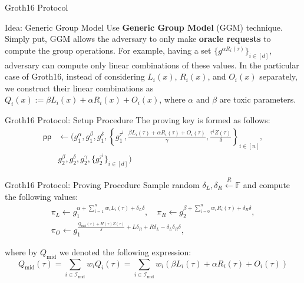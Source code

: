 \documentclass{zkdl-presentation-template}
\begin{document}
    \begin{frame}{Groth16 Protocol}
        \begin{block}{Idea: Generic Group Model}
            Use \textbf{Generic Group Model} (GGM) technique. Simply put, GGM allows the adversary to only make \textbf{oracle requests} to compute the group operations. For example, having a set $\{g^{\alpha R_i(\tau)}\}_{i \in [d]}$, adversary can compute only linear combinations of these values. In the particular case of Groth16, instead of considering $L_i(x)$, $R_i(x)$, and $O_i(x)$ separately, we construct their linear combinations as $Q_i(x) := \beta L_i(x) + \alpha R_i(x) + O_i(x)$, where $\alpha$ and $\beta$ are toxic parameters.
        \end{block}
    \end{frame}

    \begin{frame}{Groth16 Protocol: Setup Procedure}
        The proving key is formed as follows:
        \begin{align*}
            \mathsf{pp} &\gets \Big(g_1^{\alpha},g_1^{\beta},g_1^{\delta},\left\{g_1^{\tau^i},\frac{\beta L_i(\tau) + \alpha R_i(\tau) + O_i(\tau)}{\gamma}, \frac{\tau^i Z(\tau)}{\delta}\right\}_{i \in [n]}, \\
            &g_2^{\beta}, g_2^{\delta}, g_2^{\gamma}, \{g_2^{\tau^i}\}_{i \in [d]}\Big)
        \end{align*}
    \end{frame}

    \begin{frame}{Groth16 Protocol: Proving Procedure}
        Sample random $\delta_L,\delta_R \xleftarrow{R} \mathbb{F}$ and compute the following values:
        \begin{gather*}
            \pi_L \gets g_1^{\alpha + \sum_{i=1}^n w_iL_i(\tau) + \delta_L\delta}, \quad \pi_R \gets g_2^{\beta + \sum_{i=0}^n w_iR_i(\tau) + \delta_R\delta}, \\ \pi_O \gets g_1^{\frac{Q_{\text{mid}}(\tau)+H(\tau)Z(\tau)}{\delta} + L\delta_R + R\delta_L - \delta_L\delta_R\delta},
        \end{gather*}

        where by $Q_{\text{mid}}$ we denoted the following expression:
        \begin{equation*}
            Q_{\text{mid}}(\tau) = \sum_{i \in \mathcal{I}_{\text{mid}}} w_iQ_i(\tau) = \sum_{i \in \mathcal{I}_{\text{mid}}}w_i(\beta L_i(\tau) + \alpha R_i(\tau) + O_i(\tau))
        \end{equation*}
    \end{frame}
\end{document}
